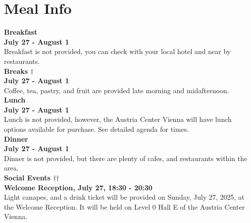 \chapter{Meal Info}
\vspace*{0.2cm}

\textbf{Breakfast}\\

\hspace{1cm} \textbf{July 27 - August 1}\\
\hspace{1cm} Breakfast is not provided, you can check with your local hotel and near by restaurants.\\

\textbf{Breaks $\dagger$}\\

\hspace{1cm} \textbf{July 27 - August 1}\\
\hspace{1cm} Coffee, tea, pastry, and fruit are provided late morning and midafternoon.\\

\textbf{Lunch}\\

\hspace{1cm} \textbf{July 27 - August 1}\\
\hspace{1cm} Lunch is not provided, however, the Austria Center Vienna will have lunch options available for purchase. See detailed agenda for times. \\

\textbf{Dinner}\\

\hspace{1cm} \textbf{July 27 - August 1}\\
\hspace{1cm} Dinner is  not provided, but there are plenty of cafes, and restaurants within the area.\\

\textbf{Social Events $\dagger$$\dagger$} \\

\textbf{Welcome Reception, July 27, 18:30 - 20:30}\\

Light canapes, and a drink ticket will be provided on Sunday, July 27, 2025, at the Welcome Reception. It will be held on Level 0 Hall E of the Austria Center Vienna.\\

